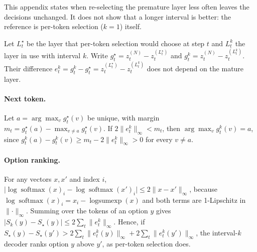 \documentclass[11pt]{article}
\begin{document}
This appendix states when re-selecting the premature layer less often leaves the decisions unchanged. It does not
show that a longer interval is better: the reference is per-token selection ($k = 1$) itself.

Let $L^\star_t$ be the layer that per-token selection would choose at step $t$ and $L^k_t$ the layer in use with
interval $k$. Write $g^\star_t = z^{(N)}_t - z^{(L^\star_t)}_t$ and $g^k_t = z^{(N)}_t - z^{(L^k_t)}_t$. Their
difference $e^k_t = g^k_t - g^\star_t = z^{(L^\star_t)}_t - z^{(L^k_t)}_t$ does not depend on the mature layer.

\paragraph{Next token.} Let $a = \arg\max_v g^\star_t(v)$ be unique, with margin
$m_t = g^\star_t(a) - \max_{v \ne a} g^\star_t(v)$. If $2\lVert e^k_t \rVert_\infty < m_t$, then
$\arg\max_v g^k_t(v) = a$, since $g^k_t(a) - g^k_t(v) \ge m_t - 2\lVert e^k_t \rVert_\infty > 0$ for every $v \ne a$.

\paragraph{Option ranking.} For any vectors $x, x'$ and index $i$,
$\lvert \log\operatorname{softmax}(x)_i - \log\operatorname{softmax}(x')_i \rvert \le 2 \lVert x - x' \rVert_\infty$,
because $\log\operatorname{softmax}(x)_i = x_i - \operatorname{logsumexp}(x)$ and both terms are 1-Lipschitz in
$\lVert\cdot\rVert_\infty$. Summing over the tokens of an option $y$ gives
$\lvert S_k(y) - S_\star(y) \rvert \le 2 \sum_t \lVert e^k_t \rVert_\infty$. Hence, if
$S_\star(y) - S_\star(y') > 2 \sum_t \lVert e^k_t(y) \rVert_\infty + 2 \sum_t \lVert e^k_t(y') \rVert_\infty$, the
interval-$k$ decoder ranks option $y$ above $y'$, as per-token selection does.
\end{document}

